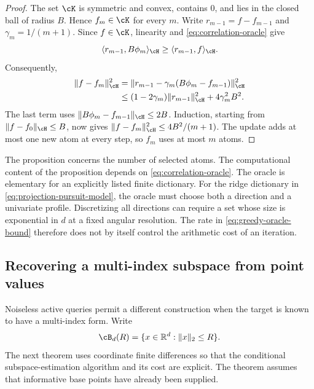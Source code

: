 \documentclass[11pt,twoside]{article}
\newcommand{\R}{\mathbb R}
\theoremstyle{definition}
\theoremstyle{remark}
\begin{document}
\begin{proof}
The set $\cK$ is symmetric and convex, contains $0$, and lies in the closed
ball of radius $B$. Hence $f_m\in\cK$ for every $m$. Write
$r_{m-1}=f-f_{m-1}$ and $\gamma_m=1/(m+1)$. Since $f\in\cK$, linearity and
\cref{eq:correlation-oracle} give
\begin{equation}
 \langle r_{m-1},B\phi_m\rangle_{\cH}
 \geq \langle r_{m-1},f\rangle_{\cH}.
 \label{eq:oracle-dominates-target}
\end{equation}
Consequently,
\begin{align*}
 \|f-f_m\|_{\cH}^2
 &=\|r_{m-1}-\gamma_m(B\phi_m-f_{m-1})\|_{\cH}^2\\
 &\leq (1-2\gamma_m)\|r_{m-1}\|_{\cH}^2
       +4\gamma_m^2B^2.
\end{align*}
The last term uses
$\|B\phi_m-f_{m-1}\|_{\cH}\leq2B$. Induction, starting from
$\|f-f_0\|_{\cH}\leq B$, now gives
$\|f-f_m\|_{\cH}^2\leq4B^2/(m+1)$.
The update adds at most one new atom at every step, so $f_m$ uses at most
$m$ atoms.
\end{proof}

The proposition concerns the number of selected atoms. The computational
content of the proposition depends on \cref{eq:correlation-oracle}. The oracle is elementary for
an explicitly listed finite dictionary. For the ridge dictionary in
\cref{eq:projection-pursuit-model}, the oracle must choose both a direction
and a univariate profile. Discretizing all directions can require a set whose
size is exponential in $d$ at a fixed angular resolution. The rate in
\cref{eq:greedy-oracle-bound} therefore does not by itself control the
arithmetic cost of an iteration.

\subsection{Recovering a multi-index subspace from point values}

Noiseless active queries permit a different construction when the target is
known to have a multi-index form. Write
\begin{equation}
 \cB_d(R)=\{x\in\R^d:\|x\|_2\leq R\}.
 \label{eq:euclidean-ball-notation}
\end{equation}
The next theorem uses coordinate finite differences so that the conditional
subspace-estimation algorithm and its cost are explicit. The theorem assumes
that informative base points have already been supplied.
\end{document}
